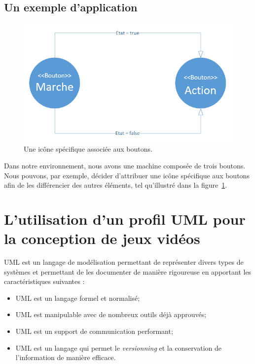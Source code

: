 \subsection{Un exemple d'application}


\begin{figure}
    \begin{center}
    \includegraphics[width=12cm]{10_img/chap4/img.PNG}
    \caption{Une ic\^one spécifique associ\'ee aux boutons.}
    \label{fig.uml_img}
    \end{center}
\end{figure}

Dans notre environnement, nous avons une machine composée de trois boutons.
Nous pouvons, par exemple, décider d'attribuer une ic\^one spécifique aux boutons afin de les différencier des autres éléments, tel qu'illustr\'e dans la figure~\ref{fig.uml_img}.




\section{L'utilisation d'un profil UML pour la conception de jeux vidéos}


UML est un langage de modélisation permettant de représenter divers types de systèmes et permettant de les documenter de manière rigoureuse en apportant les caractéristiques suivantes :

\begin{itemize}
    \item UML est un langage formel et normalisé;
    \item UML est manipulable avec de nombreux outils déjà approuvés;
    \item UML est un support de communication performant;
    \item UML est un langage qui permet le \emph{versionning} et la conservation de l'information de manière efficace.
\end{itemize}

